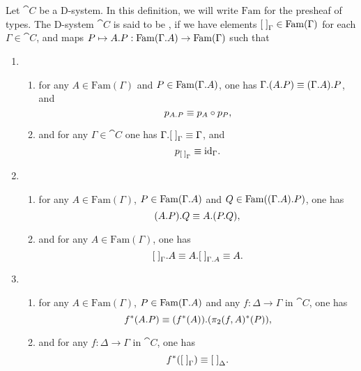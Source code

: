 \begin{defn}
Let $\cat{C}$ be a D-system. In this definition, we will write
$\mathrm{Fam}$ for the presheaf of types. The D-system $\cat{C}$
is said to be , if we have elements ${[\;]}_{\Gamma}\in
\mathrm{Fam}(\Gamma)$ for each $\Gamma\in\cat{C}$, and maps 
$P\mapsto\ctxext{A}{P}:\mathrm{Fam}(\ctxext{\Gamma}{A})\to \mathrm{Fam}(\Gamma)$
such that
\begin{enumerate}
\item 
\begin{enumerate}
\item for any $A\in\mathrm{Fam}(\Gamma)$ and $P\in\mathrm{Fam}(\ctxext{\Gamma}{A})$,
one has $\ctxext{\Gamma}{{A}{P}}\jdeq\ctxext{{\Gamma}{A}}{P}$, and
\begin{equation*}
p_{\ctxext{A}{P}}\jdeq p_A\circ p_P,
\end{equation*}
\item and for any $\Gamma\in\cat{C}$ one has $\ctxext{\Gamma}{\emptyf[\Gamma]}\jdeq\Gamma$, and
\begin{equation*}
p_{{[\;]}_{\Gamma}}\equiv{\mathrm{id}_{\Gamma}}.
\end{equation*}
\end{enumerate}
\item 
\begin{enumerate}
\item for any $A\in\mathrm{Fam}(\Gamma)$, $P\in\mathrm{Fam}(\ctxext{\Gamma}{A})$
and $Q\in\mathrm{Fam}(\ctxext{{\Gamma}{A}}{P})$, one has
\begin{equation*}
\ctxext{{A}{P}}{Q}\jdeq\ctxext{A}{{P}{Q}},
\end{equation*}
\item and for any $A\in\mathrm{Fam}(\Gamma)$, one has
\begin{equation*}
\ctxext{\emptyf[\Gamma]}{A}\jdeq\ctxext{A}{\emptyf[\ctxext{\Gamma}{A}]}\jdeq A.
\end{equation*}
\end{enumerate}
\item 
\begin{enumerate}
\item for any $A\in\mathrm{Fam}(\Gamma)$, $P\in\mathrm{Fam}(\ctxext{\Gamma}{A})$
and any $f:\Delta\to\Gamma$ in $\cat{C}$, one has
\begin{equation*}
f^\ast(\ctxext{A}{P})\jdeq \ctxext{(f^\ast(A))}{(\pi_2(f,A)^\ast(P))},
\end{equation*}
\item and for any $f:\Delta\to\Gamma$ in $\cat{C}$, one has
\begin{equation*}
f^\ast({[\;]}_{\Gamma})\equiv{[\;]}_{\Delta}.
\end{equation*}
\end{enumerate}
\end{enumerate} 
\end{defn}

